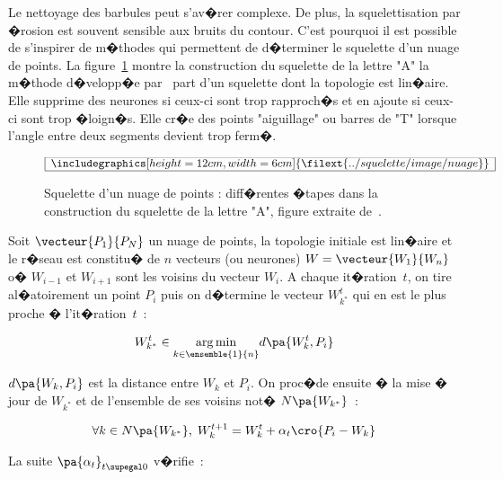 Le nettoyage des barbules peut s'av�rer complexe. De plus, la squelettisation par �rosion est souvent sensible aux bruits du contour. C'est pourquoi il est possible de s'inspirer de m�thodes qui permettent de d�terminer le squelette d'un nuage de points. La figure~\ref{squelette_nuage_points} montre la construction du squelette de la lettre "A" la m�thode d�velopp�e par~ part d'un squelette dont la topologie est lin�aire. Elle supprime des neurones si ceux-ci sont trop rapproch�s et en ajoute si ceux-ci sont trop �loign�s. Elle cr�e des points "aiguillage" ou barres de "T" lorsque l'angle entre deux segments devient trop ferm�.


            \begin{figure}[ht]
        $$\frame{$\begin{array}[c]{c}\includegraphics[height=12cm, width=6cm]
        {\filext{../squelette/image/nuage}}\end{array}$}$$
        \caption{    Squelette d'un nuage de points : diff�rentes �tapes dans 
                            la construction du squelette de la lettre "A", figure extraite de~.}
        \label{squelette_nuage_points}
            \end{figure}



Soit $\vecteur{P_1}{P_N}$ un nuage de points, la topologie initiale est lin�aire et le r�seau est constitu� de $n$ vecteurs (ou neurones) $W = \vecteur{W_1}{W_n}$ o� $W_{i-1}$ et $W_{i+1}$ sont les voisins du vecteur $W_i$. A chaque it�ration~$t$, on tire al�atoirement un point $P_i$ puis on d�termine le vecteur $W^t_{k^*}$ qui en est le plus proche � l'it�ration~$t$~:

             
            \begin{eqnarray*}
            W^t_{k^*} \in \underset {k \in \ensemble {1}{n} } { \arg \min } d \pa{ W_k^t, P_i }
            \end{eqnarray*}


$d \pa{ W_k, P_i }$ est la distance entre $W_k$ et $P_i$. On proc�de ensuite � la mise � jour de $W_{k^*}$ et de l'ensemble de ses voisins not� $N\pa{W_{k^*}}$~:

        
            \begin{eqnarray*}
            \forall k \in N\pa{W_{k^*}}, \; 
                W^{t+1}_k = W^{t}_k + \alpha_t \cro { P_i - W_k }
            \end{eqnarray*}

La suite $\pa{\alpha_t}_{t \supegal 0}$ v�rifie~:

